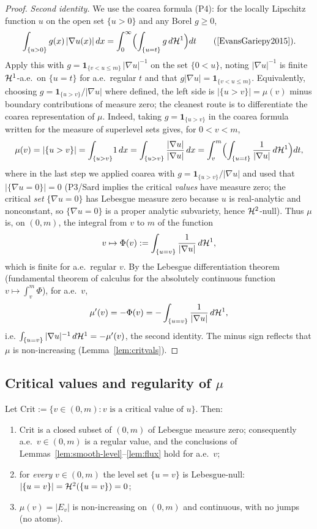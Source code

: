 \begin{proof}
\emph{Second identity.}
We use the coarea formula (P4): for the locally Lipschitz function $u$ on the
open set $\{u>0\}$ and any Borel $g\ge0$,
\[
  \int_{\{u>0\}}g(x)\,|\nabla u(x)|\,dx
  =\int_0^{\infty}\Bigl(\int_{\{u=t\}}g\,d\HH^1\Bigr)dt
  \qquad(\cite[\S3.4.2, Theorem~5]{EvansGariepy2015}).
\]
Apply this with $g=\mathbf 1_{\{v<u\le m\}}\,|\nabla u|^{-1}$ on the set
$\{0<u\}$, noting $|\nabla u|^{-1}$ is finite $\mathcal{H}^1$-a.e.\ on $\{u=t\}$ for
a.e.\ regular $t$ and that $g|\nabla u|=\mathbf 1_{\{v<u\le m\}}$. Equivalently,
choosing $g=\mathbf 1_{\{u>v\}}/|\nabla u|$ where defined, the left side is
$|\{u>v\}|=\mu(v)$ minus boundary contributions of measure zero; the cleanest
route is to differentiate the coarea representation of $\mu$. Indeed, taking
$g=\mathbf 1_{\{u>v\}}$ in the coarea formula written for the measure of
superlevel sets gives, for $0<v<m$,
\[
  \mu(v)=|\{u>v\}|=\int_{\{u>v\}}\!1\,dx
  =\int_{\{u>v\}}\frac{|\nabla u|}{|\nabla u|}\,dx
  =\int_v^{m}\Bigl(\int_{\{u=t\}}\frac{1}{|\nabla u|}\,d\mathcal{H}^1\Bigr)dt,
\]
where in the last step we applied coarea with $g=\mathbf 1_{\{u>v\}}/|\nabla u|$
and used that $|\{\nabla u=0\}|=0$ (P3/Sard implies the critical \emph{values}
have measure zero; the critical \emph{set} $\{\nabla u=0\}$ has Lebesgue measure
zero because $u$ is real-analytic and nonconstant, so $\{\nabla u=0\}$ is a
proper analytic subvariety, hence $\mathcal{H}^2$-null). Thus $\mu$ is, on $(0,m)$, the
integral from $v$ to $m$ of the function
\[
  v\mapsto \Phi(v):=\int_{\{u=v\}}\frac{1}{|\nabla u|}\,d\mathcal{H}^1 ,
\]
which is finite for a.e.\ regular $v$. By the Lebesgue differentiation theorem
(fundamental theorem of calculus for the absolutely continuous function
$v\mapsto\int_v^m\Phi$), for a.e.\ $v$,
\[
  \mu'(v)=-\Phi(v)=-\int_{\{u=v\}}\frac{1}{|\nabla u|}\,d\mathcal{H}^1 ,
\]
i.e. $\int_{\{u=v\}}|\nabla u|^{-1}\,d\mathcal{H}^1=-\mu'(v)$, the second identity. The
minus sign reflects that $\mu$ is non-increasing (Lemma~\ref{lem:critvals}).
\end{proof}

\subsection*{Critical values and regularity of $\mu$}

\begin{lemma}\label{lem:critvals}
Let $\mathrm{Crit}:=\{v\in(0,m):v\text{ is a critical value of }u\}$. Then:
\begin{enumerate}
\item[(a)] $\mathrm{Crit}$ is a closed subset of $(0,m)$ of Lebesgue measure
  zero; consequently a.e.\ $v\in(0,m)$ is a regular value, and the conclusions of
  Lemmas~\ref{lem:smooth-level}--\ref{lem:flux} hold for a.e.\ $v$;
\item[(b)] for \emph{every} $v\in(0,m)$ the level set $\{u=v\}$ is Lebesgue-null:
  $|\{u=v\}|=\mathcal{H}^2(\{u=v\})=0$;
\item[(c)] $\mu(v)=|E_v|$ is non-increasing on $(0,m)$ and continuous, with no
  jumps (no atoms).
\end{enumerate}
\end{lemma}


